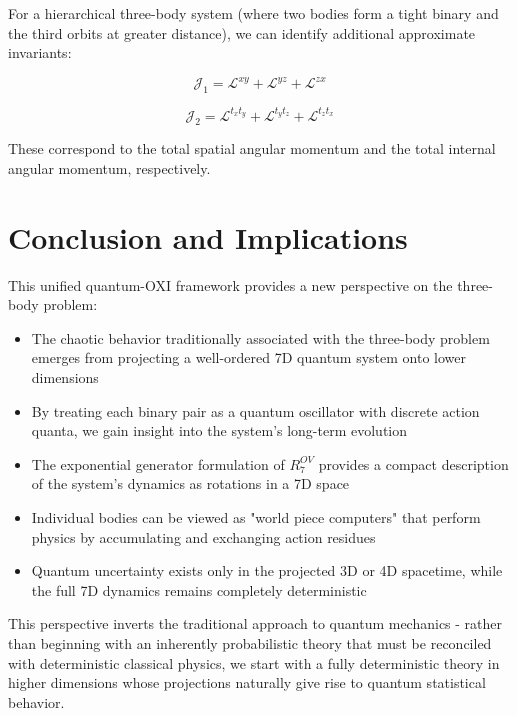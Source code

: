 \documentclass{article}
\begin{document}
For a hierarchical three-body system (where two bodies form a tight binary and the third orbits at greater distance), we can identify additional approximate invariants:

\begin{equation}
\mathcal{J}_1 = \mathcal{L}^{xy} + \mathcal{L}^{yz} + \mathcal{L}^{zx}
\end{equation}

\begin{equation}
\mathcal{J}_2 = \mathcal{L}^{t_x t_y} + \mathcal{L}^{t_y t_z} + \mathcal{L}^{t_z t_x}
\end{equation}

These correspond to the total spatial angular momentum and the total internal angular momentum, respectively.

\section{Conclusion and Implications}

This unified quantum-OXI framework provides a new perspective on the three-body problem:

\begin{itemize}
\item The chaotic behavior traditionally associated with the three-body problem emerges from projecting a well-ordered 7D quantum system onto lower dimensions
\item By treating each binary pair as a quantum oscillator with discrete action quanta, we gain insight into the system's long-term evolution
\item The exponential generator formulation of $R^{OV}_7$ provides a compact description of the system's dynamics as rotations in a 7D space
\item Individual bodies can be viewed as "world piece computers" that perform physics by accumulating and exchanging action residues
\item Quantum uncertainty exists only in the projected 3D or 4D spacetime, while the full 7D dynamics remains completely deterministic
\end{itemize}

This perspective inverts the traditional approach to quantum mechanics - rather than beginning with an inherently probabilistic theory that must be reconciled with deterministic classical physics, we start with a fully deterministic theory in higher dimensions whose projections naturally give rise to quantum statistical behavior.
\end{document}
